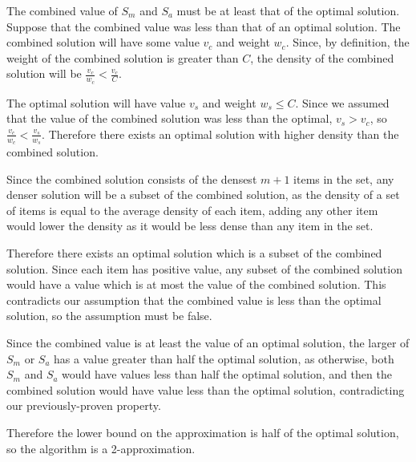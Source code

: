 \documentclass[11pt]{article}
\begin{document}
The combined value of $S_m$ and $S_a$ must be at least that of the optimal solution. Suppose that the combined value was less than that of an optimal solution. The combined solution will have some value $v_c$ and weight $w_c$. Since, by definition, the weight of the combined solution is greater than $C$, the density of the combined solution will be $\frac{v_c}{w_c} < \frac{v_c}{C}$. 

The optimal solution will have value $v_s$ and weight $w_s \leq C$. Since we assumed that the value of the combined solution was less than the optimal, $v_s > v_c$, so $\frac{v_c}{w_c} < \frac{v_s}{w_s}$. Therefore there exists an optimal solution with higher density than the combined solution.

Since the combined solution consists of the densest $m+1$ items in the set, any denser solution will be a subset of the combined solution, as the density of a set of items is equal to the average density of each item, adding any other item would lower the density as it would be less dense than any item in the set.

Therefore there exists an optimal solution which is a subset of the combined solution. Since each item has positive value, any subset of the combined solution would have a value which is at most the value of the combined solution. This contradicts our assumption that the combined value is less than the optimal solution, so the assumption must be false.

Since the combined value is at least the value of an optimal solution, the larger of $S_m$ or $S_a$ has a value greater than half the optimal solution, as otherwise, both $S_m$ and $S_a$ would have values less than half the optimal solution, and then the combined solution would have value less than the optimal solution, contradicting our previously-proven property.

Therefore the lower bound on the approximation is half of the optimal solution, so the algorithm is a 2-approximation.
\end{document}
